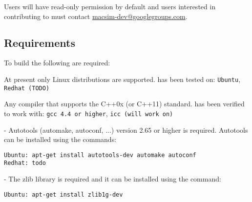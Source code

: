 Users will have read-only permission by default and users interested
in contributing to \SIM must contact
\href{mailto:macsim-dev@googlegroups.com}{macsim-dev@googlegroups.com}.



\subsection{Requirements}

To build \SIM the following are required:

\begingroup
\renewcommand\descriptionlabel[1]{\textit{\hspace\labelsep{#1}}}
\begin{description}\firmlist
  \item[Operating System] At present only Linux distributions are supported. \SIM has been tested on:
   \Verb+Ubuntu+, \Verb+Redhat (TODO)+
  \item[Compiler] Any compiler that supports the C++0x (or C++11)
    standard. \SIM has been verified to work with: \Verb+gcc 4.4 or higher+, \Verb+icc (will work on)+
  \item[Autotools] - Autotools (automake, autoconf,
    ...) version 2.65 or higher is required. Autotools can be installed using the commands:
\begin{Verbatim}
Ubuntu: apt-get install autotools-dev automake autoconf
Redhat: todo
\end{Verbatim}
  \item[Libraries] - The zlib library is required and it can be installed using the command:
\begin{Verbatim}
Ubuntu: apt-get install zlib1g-dev
\end{Verbatim}
\end{description}
\endgroup




